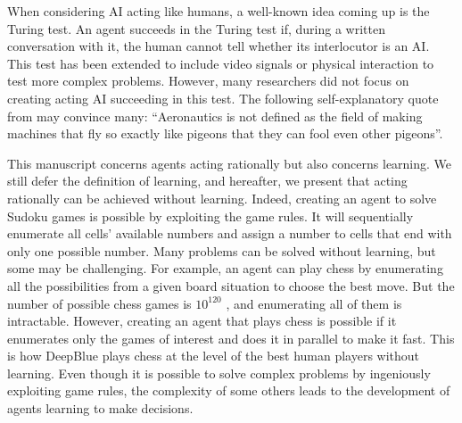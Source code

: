 When considering AI acting like humans, a well-known idea coming up is the Turing test.
An agent succeeds in the Turing test if, during a written conversation with it, the human cannot tell whether its interlocutor is an AI.
This test has been extended to include video signals or physical interaction to test more complex problems.
However, many researchers did not focus on creating acting AI succeeding in this test.
The following self-explanatory quote from \cite{russel2010} may convince many: ``Aeronautics is not defined as the field of making machines that fly so exactly like pigeons that they can fool even other pigeons''.

This manuscript concerns agents acting rationally but also concerns learning.
We still defer the definition of learning, and hereafter, we present that acting rationally can be achieved without learning.
Indeed, creating an agent to solve Sudoku games is possible by exploiting the game rules.
It will sequentially enumerate all cells' available numbers and assign a number to cells that end with only one possible number.
Many problems can be solved without learning, but some may be challenging.
For example, an agent can play chess by enumerating all the possibilities from a given board situation to choose the best move.
But the number of possible chess games is $10^{120}$ \citep{shannon1950}, and enumerating all of them is intractable.
However, creating an agent that plays chess is possible if it enumerates only the games of interest and does it in parallel to make it fast.
This is how DeepBlue \citep{campbell2002deep} plays chess at the level of the best human players without learning.
Even though it is possible to solve complex problems by ingeniously exploiting game rules, the complexity of some others leads to the development of agents learning to make decisions.

